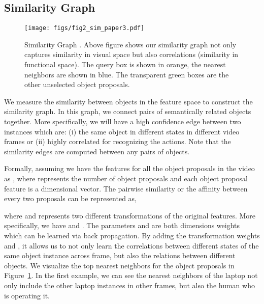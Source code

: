 \documentclass[runningheads]{llncs}
\begin{document}
\vspace{-0.1in}
\subsection{Similarity Graph}
\vspace{-0.05in}

\begin{figure}[t]
\centering
\texttt{[image: figs/fig2\_sim\_paper3.pdf]}
\vspace{-1em}
\caption{Similarity Graph . Above figure shows our similarity graph not only captures similarity in visual space but also correlations (similarity in functional space). The query box is shown in orange, the nearest neighbors are shown in blue. The transparent green boxes are the other unselected object proposals. }
\label{fig:simgraph}
\vspace{-1em}
\end{figure}

We measure the similarity between objects in the feature space to construct the similarity graph. In this graph, we connect pairs of semantically related objects together. More specifically, we will have a high confidence edge between two instances which are: (i) the same object in different states in different video frames or (ii) highly correlated for recognizing the actions. Note that the similarity edges are computed between any pairs of objects.

Formally, assuming we have the features for all the object proposals in the video as , where  represents the number of object proposals and each  object proposal feature  is a  dimensional vector. The pairwise similarity or the affinity between every two proposals can be represented as,

where  and  represents two different transformations of the original features. More specifically, we have  and .   The parameters  and  are both  dimensions weights which can be learned via back propagation.  By adding the transformation weights  and , it allows us to not only learn the correlations between different states of the same object instance across frame, but also the relations between different objects. We visualize the top nearest neighbors for the object proposals in Figure~\ref{fig:simgraph}. In the first example, we can see the nearest neighbors of the laptop  not only include the other laptop instances in other frames, but also the human who is operating it. 
\end{document}
